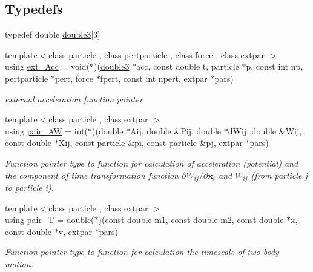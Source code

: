 \subsection*{Typedefs}
\begin{DoxyCompactItemize}
\item 
typedef double \hyperlink{namespaceARC_affb4fe085f3ea94b378be8bc9382a75d}{double3}\mbox{[}3\mbox{]}
\item 
{\footnotesize template$<$class particle , class pertparticle , class force , class extpar $>$ }\\using \hyperlink{namespaceARC_a7aeda3b3bd009af7ac964748834dd312}{ext\+\_\+\+Acc} = void($\ast$)(\hyperlink{namespaceARC_affb4fe085f3ea94b378be8bc9382a75d}{double3} $\ast$acc, const double t, particle $\ast$p, const int np, pertparticle $\ast$pert, force $\ast$fpert, const int npert, extpar $\ast$pars)
\begin{DoxyCompactList}\small\item\em external acceleration function pointer \end{DoxyCompactList}\item 
{\footnotesize template$<$class particle , class extpar $>$ }\\using \hyperlink{namespaceARC_a270b4c77765cacf073a5ef5f928f1d63}{pair\+\_\+\+AW} = int($\ast$)(double $\ast$Aij, double \&Pij, double $\ast$d\+Wij, double \&Wij, const double $\ast$Xij, const particle \&pi, const particle \&pj, extpar $\ast$pars)
\begin{DoxyCompactList}\small\item\em Function pointer type to function for calculation of acceleration (potential) and the component of time transformation function $\partial W_{ij}/\partial \mathbf{x}_i$ and $W_{ij}$ (from particle j to particle i). \end{DoxyCompactList}\item 
{\footnotesize template$<$class particle , class extpar $>$ }\\using \hyperlink{namespaceARC_aa489b85f285776ca334a82d85dc0381a}{pair\+\_\+T} = double($\ast$)(const double m1, const double m2, const double $\ast$x, const double $\ast$v, extpar $\ast$pars)
\begin{DoxyCompactList}\small\item\em Function pointer type to function for calculation the timescale of two-\/body motion. \end{DoxyCompactList}\end{DoxyCompactItemize}


